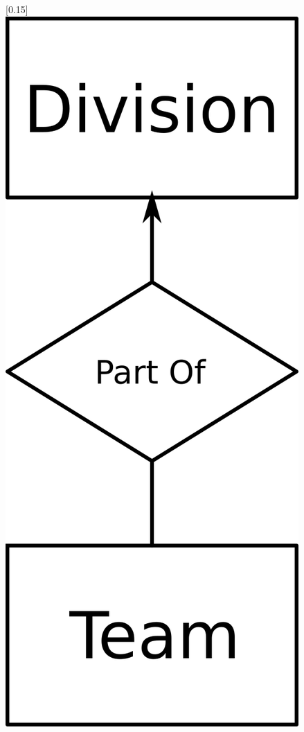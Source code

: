 \documentclass[a4paper]{article}
\begin{document}
\begin{figure}[H]
[0.15\linewidth]{\centering\includegraphics[width=0.6\linewidth]{entity5.png}}

\end{figure}
\end{document}
